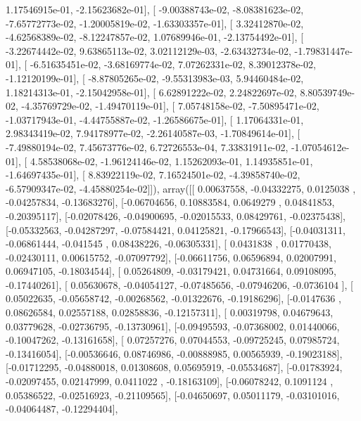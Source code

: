 \documentclass{article}
\begin{document}
          1.17546915e-01,  -2.15623682e-01],
       [ -9.00388743e-02,  -8.08381623e-02,  -7.65772773e-02,
         -1.20005819e-02,  -1.63303357e-01],
       [  3.32412870e-02,  -4.62568389e-02,  -8.12247857e-02,
          1.07689946e-01,  -2.13754492e-01],
       [ -3.22674442e-02,   9.63865113e-02,   3.02112129e-03,
         -2.63432734e-02,  -1.79831447e-01],
       [ -6.51635451e-02,  -3.68169774e-02,   7.07262331e-02,
          8.39012378e-02,  -1.12120199e-01],
       [ -8.87805265e-02,  -9.55313983e-03,   5.94460484e-02,
          1.18214313e-01,  -2.15042958e-01],
       [  6.62891222e-02,   2.24822697e-02,   8.80539749e-02,
         -4.35769729e-02,  -1.49470119e-01],
       [  7.05748158e-02,  -7.50895471e-02,  -1.03717943e-01,
         -4.44755887e-02,  -1.26586675e-01],
       [  1.17064331e-01,   2.98343419e-02,   7.94178977e-02,
         -2.26140587e-03,  -1.70849614e-01],
       [ -7.49880194e-02,   7.45673776e-02,   6.72726553e-04,
          7.33831911e-02,  -1.07054612e-01],
       [  4.58538068e-02,  -1.96124146e-02,   1.15262093e-01,
          1.14935851e-01,  -1.64697435e-01],
       [  8.83922119e-02,   7.16524501e-02,  -4.39858740e-02,
         -6.57909347e-02,  -4.45880254e-02]]), array([[ 0.00637558, -0.04332275,  0.0125038 , -0.04257834, -0.13683276],
       [-0.06704656,  0.10883584,  0.0649279 ,  0.04841853, -0.20395117],
       [-0.02078426, -0.04900695, -0.02015533,  0.08429761, -0.02375438],
       [-0.05332563, -0.04287297, -0.07584421,  0.04125821, -0.17966543],
       [-0.04031311, -0.06861444, -0.041545  ,  0.08438226, -0.06305331],
       [ 0.0431838 ,  0.01770438, -0.02430111,  0.00615752, -0.07097792],
       [-0.06611756,  0.06596894,  0.02007991,  0.06947105, -0.18034544],
       [ 0.05264809, -0.03179421,  0.04731664,  0.09108095, -0.17440261],
       [ 0.05630678, -0.04054127, -0.07485656, -0.07946206, -0.0736104 ],
       [ 0.05022635, -0.05658742, -0.00268562, -0.01322676, -0.19186296],
       [-0.0147636 ,  0.08626584,  0.02557188,  0.02858836, -0.12157311],
       [ 0.00319798,  0.04679643,  0.03779628, -0.02736795, -0.13730961],
       [-0.09495593, -0.07368002,  0.01440066, -0.10047262, -0.13161658],
       [ 0.07257276,  0.07044553, -0.09725245,  0.07985724, -0.13416054],
       [-0.00536646,  0.08746986, -0.00888985,  0.00565939, -0.19023188],
       [-0.01712295, -0.04880018,  0.01308608,  0.05695919, -0.05534687],
       [-0.01783924, -0.02097455,  0.02147999,  0.0411022 , -0.18163109],
       [-0.06078242,  0.1091124 ,  0.05386522, -0.02516923, -0.21109565],
       [-0.04650697,  0.05011179, -0.03101016, -0.04064487, -0.12294404],
\end{document}
